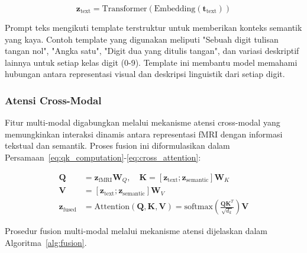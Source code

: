 \begin{equation}
\mathbf{z}_{\text{text}} = \text{Transformer}(\text{Embedding}(\mathbf{t}_{\text{text}}))
\label{eq:text_encoder}
\end{equation}

Prompt teks mengikuti template terstruktur untuk memberikan konteks semantik yang kaya. Contoh template yang digunakan meliputi "Sebuah digit tulisan tangan nol", "Angka satu", "Digit dua yang ditulis tangan", dan variasi deskriptif lainnya untuk setiap kelas digit (0-9). Template ini membantu model memahami hubungan antara representasi visual dan deskripsi linguistik dari setiap digit.

\subsubsection{Atensi Cross-Modal}
Fitur multi-modal digabungkan melalui mekanisme atensi cross-modal yang memungkinkan interaksi dinamis antara representasi fMRI dengan informasi tekstual dan semantik. Proses fusion ini diformulasikan dalam Persamaan~\ref{eq:qk_computation}-\ref{eq:cross_attention}:

\begin{align}
\mathbf{Q} &= \mathbf{z}_{\text{fMRI}} \mathbf{W}_Q, \quad \mathbf{K} = [\mathbf{z}_{\text{text}}; \mathbf{z}_{\text{semantic}}] \mathbf{W}_K \label{eq:qk_computation} \\
\mathbf{V} &= [\mathbf{z}_{\text{text}}; \mathbf{z}_{\text{semantic}}] \mathbf{W}_V \label{eq:v_computation} \\
\mathbf{z}_{\text{fused}} &= \text{Attention}(\mathbf{Q}, \mathbf{K}, \mathbf{V}) = \text{softmax}\left(\frac{\mathbf{Q}\mathbf{K}^T}{\sqrt{d_k}}\right)\mathbf{V} \label{eq:cross_attention}
\end{align}

Prosedur fusion multi-modal melalui mekanisme atensi dijelaskan dalam Algoritma~\ref{alg:fusion}.

